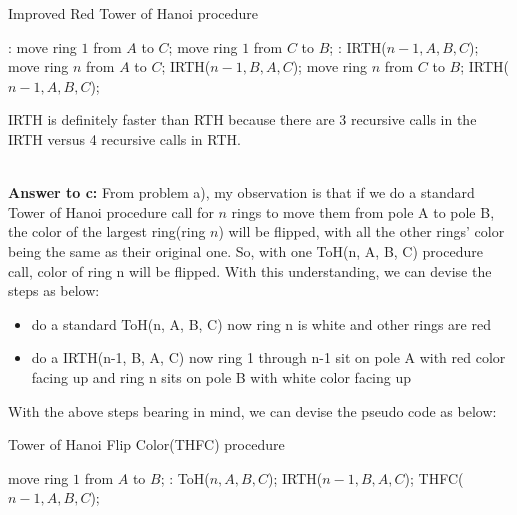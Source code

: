 \documentclass[a4paper,11pt]{article}
\theoremstyle{mytheor}
\begin{document}
\begin{algorithm}[H]
\caption{Improved Red Tower of Hanoi procedure}\label{IRTH}
\begin{algorithmic}[1]
  :
    \State move ring $1$ from $A$ to $C$;
    \State move ring $1$ from $C$ to $B$;
  \Else:
    \State IRTH($n-1, A, B, C$);
    \State move ring $n$ from $A$ to $C$;
    \State IRTH($n-1, B, A, C$);
    \State move ring $n$ from $C$ to $B$;
    \State IRTH($n-1, A, B, C$);
  \EndIf
\EndProcedure
\end{algorithmic}
\end{algorithm}

IRTH is definitely faster than RTH because there are 3 recursive calls in the IRTH versus 4 recursive calls in RTH.

~\\

\vspace{1.2in}
\noindent\textbf{Answer to c:} 
From problem a), my observation is that if we do a standard Tower of Hanoi procedure call for $n$ rings to move them from pole A to pole B, the color of the largest ring(ring $n$) will be flipped, with all the other rings' color being the same as their original one. So, with one ToH(n, A, B, C) procedure call, color of ring n will be flipped. With this understanding, we can devise the steps as below:
\begin{itemize}
    \item do a standard ToH(n, A, B, C) {now ring n is white and other rings are red}
    \item do a IRTH(n-1, B, A, C) {now ring 1 through n-1 sit on pole A with red color facing up and ring n sits on pole B with white color facing up}
\end{itemize}

With the above steps bearing in mind, we can devise the pseudo code as below:
\iffalse
\begin{lstlisting}[label={list:seventh2},caption=Tower of Hanoi Flip Color procedure]
procedure THFC(n, A, B, C);
  if n == 1:
    move ring 1 from A to B;
  else:
    ToH(n, A, B, C); #{flip color of ring n, upside color of other rings is still red}
    IRTH(n-1, B, A, C);  #{ring 1 through n-1 are moved back to pole A and their upside color is still red}
    THFC(n-1, A, B, C);  #{recursive call to flip the color of ring 1 through n-1}
\end{lstlisting}
\fi

\begin{algorithm}[H]
\caption{Tower of Hanoi Flip Color(THFC) procedure}\label{THFC}
\begin{algorithmic}[1]
    \State move ring $1$ from $A$ to $B$;
  \Else:
    \State ToH($n, A, B, C$); 
    \State IRTH($n-1, B, A, C$);  
    \State THFC($n-1, A, B, C$);  
  \EndIf
\EndProcedure
\end{algorithmic}
\end{algorithm}
\end{document}
